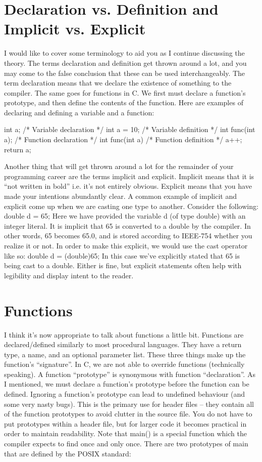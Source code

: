 \documentclass{article}
\begin{document}
\section{Declaration vs. Definition and Implicit vs. Explicit}

I would like to cover some terminology to aid you as I continue discussing the theory. The terms declaration
and definition get thrown around a lot, and you may come to the false conclusion that these can be used
interchangeably. The term declaration means that we declare the existence of something to the compiler. The
same goes for functions in C. We first must declare a function’s prototype, and then define the contents of
the function. Here are examples of declaring and defining a variable and a function:

\begin{cblk}
int a;               /* Variable declaration */
int a = 10;          /* Variable definition */
int func(int a);     /* Function declaration */
int func(int a) {    /* Function definition */
	a++;
	return a;
}
\end{cblk}

Another thing that will get thrown around a lot for the remainder of your programming career are the terms
implicit and explicit. Implicit means that it is “not written in bold” i.e. it’s not entirely obvious.
Explicit means that you have made your intentions abundantly clear. A common example of implicit and explicit
come up when we are casting one type to another. Consider the following: double d = 65; Here we have provided
the variable d (of type double) with an integer literal. It is implicit that 65 is converted to a double by
the compiler. In other words, 65 becomes 65.0, and is stored according to IEEE-754 whether you realize it or
not. In order to make this explicit, we would use the cast operator like so: double d = (double)65; In this
case we’ve explicitly stated that 65 is being cast to a double. Either is fine, but explicit statements often
help with legibility and display intent to the reader.

\section{Functions}

I think it’s now appropriate to talk about functions a little bit. Functions are declared/defined similarly to
most procedural languages. They have a return type, a name, and an optional parameter list. These three things
make up the function’s “signature”. In C, we are not able to override functions (technically speaking). A
function “prototype” is synonymous with function “declaration”. As I mentioned, we must declare a function’s
prototype before the function can be defined. Ignoring a function’s prototype can lead to undefined behaviour
(and some very nasty bugs). This is the primary use for header files – they contain all of the function
prototypes to avoid clutter in the source file. You do not have to put prototypes within a header file, but
for larger code it becomes practical in order to maintain readability. Note that main() is a special function
which the compiler expects to find once and only once. There are two prototypes of main that are defined by
the POSIX standard:
\end{document}
